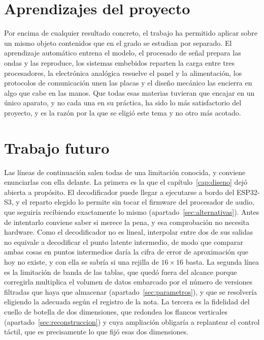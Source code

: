\section{Aprendizajes del proyecto}

Por encima de cualquier resultado concreto, el trabajo ha permitido aplicar
sobre un mismo objeto contenidos que en el grado se estudian por separado. El
aprendizaje automático entrena el modelo, el procesado de señal prepara las
ondas y las reproduce, los sistemas embebidos reparten la carga entre tres
procesadores, la electrónica analógica resuelve el panel y la alimentación, los
protocolos de comunicación unen las placas y el diseño mecánico las encierra en
algo que cabe en las manos. Que todas esas materias tuvieran que encajar en un
único aparato, y no cada una en su práctica, ha sido lo más satisfactorio del
proyecto, y es la razón por la que se eligió este tema y no otro más acotado.

\section{Trabajo futuro}
\hypertarget{RE3.2b}{}\label{RE3.2b}

Las líneas de continuación salen todas de una limitación conocida, y conviene
enunciarlas con ella delante. La primera es la que el capítulo~\ref{cap:diseno}
dejó abierta a propósito. El decodificador puede llegar a ejecutarse a bordo del
ESP32-S3, y el reparto elegido lo permite sin tocar el firmware del procesador
de audio, que seguiría recibiendo exactamente lo mismo
(apartado~\ref{sec:alternativas}). Antes de intentarlo conviene saber si merece
la pena, y esa comprobación no necesita hardware. Como el decodificador no es
lineal, interpolar entre dos de sus salidas no equivale a decodificar el punto
latente intermedio, de modo que comparar ambas cosas en puntos intermedios daría
la cifra de error de aproximación que hoy no existe, y con ella se sabría si una
rejilla de $16 \times 16$ basta. La segunda línea es la limitación de banda de
las tablas, que quedó fuera del alcance porque corregirla multiplica el volumen
de datos embarcado por el número de versiones filtradas que haya que almacenar
(apartado~\ref{sec:parametros}), y que se resolvería eligiendo la adecuada según
el registro de la nota. La tercera es la fidelidad del cuello de botella de dos
dimensiones, que redondea los flancos verticales
(apartado~\ref{sec:reconstruccion}) y cuya ampliación obligaría a replantear el
control táctil, que es precisamente lo que fijó esas dos dimensiones.

